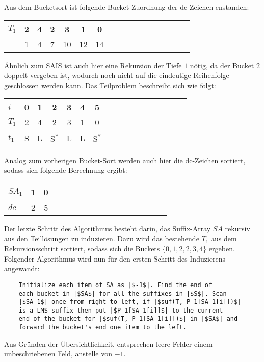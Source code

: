 \noindent Aus dem Bucketsort ist folgende Bucket-Zuordnung der dc-Zeichen enstanden:

\begin{center}
  \begin{tabular}{ | l | c | c | c | c | c | c | c | c | c | c | c | c | c | c | c | c | }
    \hline
        $T_1$ & 2 & 4 & 2 & 3 & 1 & 0 \\ \hline
              & 1 & 4 & 7 & 10 & 12 & 14  \\
    \hline
  \end{tabular}
\end{center}
\bigskip
Ähnlich zum SAIS ist auch hier eine Rekursion der Tiefe $1$ nötig, da der Bucket $2$ doppelt vergeben ist, wodurch noch nicht auf die eindeutige Reihenfolge geschlossen werden kann. Das Teilproblem beschreibt sich wie folgt:

\begin{center}
  \begin{tabular}{ | l | c | c | c | c | c | c | c | c | c | c | c | c | c | c | c | c | }
    \hline
        $i$ & 0 & 1 & 2 & 3 & 4 & 5 \\ \hline
      $T_1$ & 2 & 4 & 2 & 3 & 1 & 0  \\ \hline
      $t_1$ & S & L & S\textsuperscript{*} & L & L & S\textsuperscript{*} \\
    \hline
  \end{tabular}
\end{center}
\bigskip

\noindent Analog zum vorherigen Bucket-Sort werden auch hier die dc-Zeichen sortiert, sodass sich folgende Berechnung ergibt:

\begin{center}
  \begin{tabular}{ | l | c | c | c | c | c | c | c | c | c | c | c | c | c | c | c | c | }
    \hline
        $SA_1$ & 1 & 0 \\ \hline
        $dc$ & 2 & 5 \\
    \hline
  \end{tabular}
\end{center}
\bigskip

\noindent Der letzte Schritt des Algorithmus besteht darin, das Suffix-Array $SA$ rekursiv aus den Teillösungen zu induzieren. Dazu wird das bestehende $T_1$ aus dem Rekursionsschritt sortiert, sodass sich die Buckets $\{0,1,2,2,3,4\}$ ergeben. Folgender Algorithmus wird nun für den ersten Schritt des Induzierens angewandt\cite[Kap.~4.5]{saca:6}:
\begin{verbatim}
    Initialize each item of SA as |$-1$|. Find the end of
    each bucket in |$SA$| for all the suffixes in |$S$|. Scan
    |$SA_1$| once from right to left, if |$suf(T, P_1[SA_1[i]])$|
    is a LMS suffix then put |$P_1[SA_1[i]]$| to the current
    end of the bucket for |$suf(T, P_1[SA_1[i]])$| in |$SA$| and
    forward the bucket's end one item to the left.
\end{verbatim}
Aus Gründen der Übersichtlichkeit, entsprechen leere Felder einem unbeschriebenen Feld, anstelle von $-1$.

